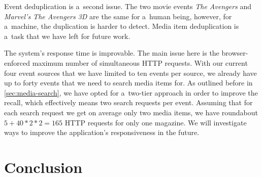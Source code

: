 \documentclass{acm_proc_article-sp}
\let\oldemph\emph
\renewcommand{\emph}[1]{\oldemph{\fontsize{9}{9}\selectfont #1}}
\begin{document}
Event deduplication is a~second issue.
The two movie events \emph{The Avengers} and
\emph{Marvel's The Avengers 3D} are the same for a~human being,
however, for a~machine, the duplication is harder to detect.
Media item deduplication is a~task that we have left for future work.

The system's response time is improvable.
The main issue here is the browser-enforced maximum number
of simultaneous HTTP requests.
With our current four event sources that we have limited
to ten events per source, we already have up to forty events
that we need to search media items for.
As outlined before in \autoref{sec:media-search},
we have opted for a~two-tier approach in order to improve the recall,
which effectively means two search requests per event.
Assuming that for each search request we get on average only two media items,
we have roundabout $5+40*2*2=165$ HTTP requests for only one magazine.
We will investigate ways to improve the application's responsiveness
in the future.

\section{Conclusion}






\balancecolumns
\end{document}
